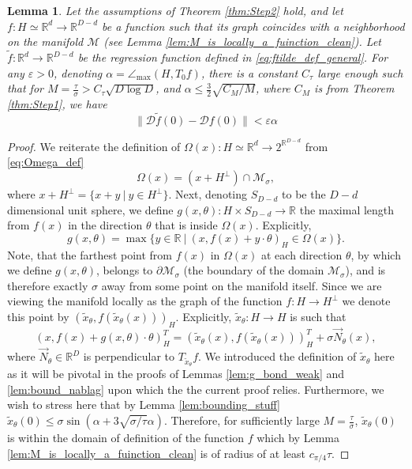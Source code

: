 \documentclass[12pt]{article}
\newtheorem{Lemma}[Theorem]{Lemma}
\theoremstyle{remark}
\newcommand{\RR}{\mathbb{R}}
\newcommand{\MM}{\mathcal{M}}
\newcommand{\DD}{\mathcal{D}}
\newcommand{\eps}{\varepsilon}
\newcommand{\wtilde}[1]{\widetilde{#1}}
\newcommand{\maxangle}{\angle_{\max}}
\begin{document}
\begin{appendices}
\begin{Lemma}\label{lem:bound_Df-Dfwtilde}
 Let the assumptions of Theorem \ref{thm:Step2} hold, and let $ f:H\simeq\RR^d\to\RR^{D-d} $ be a function such that its graph coincides with a neighborhood on the manifold $\MM$ (see Lemma \ref{lem:M_is_locally_a_fuinction_clean}). Let $\wtilde f:\RR^d\to\RR^{D-d} $ be the regression function   defined in \eqref{eq:ftilde_def_general}. 
 For any $\eps>0$, denoting $\alpha = \maxangle(H, T_0 f)$, there is a constant $C_\tau$ large enough such that for $M = \frac{\tau}{\sigma} >C_\tau\sqrt{D \log D}$, and $\alpha \leq \frac{3}{2} \sqrt{C_M/M}$, where $C_M$ is from Theorem \ref{thm:Step1}, we have 
    \[
    \|\DD\wtilde{f}(0) - \DD f(0)\| < \eps \alpha
    \]
\end{Lemma}
\begin{proof}
We reiterate the definition of $\Omega(x):H \simeq \RR^d \to 2^{\RR^{D-d}}$ from \eqref{eq:Omega_def}
\begin{equation*}
\Omega(x) = (x + H^\perp) \cap  \MM_\sigma
,    
\end{equation*}
where $x + H^\perp = \{x + y ~|~ y\in H^\perp\}$.
Next, denoting $S_{D-d}$ to be the $D-d$ dimensional unit sphere, we define $g(x, \theta):H\times S_{D-d}\to \RR$ the maximal length from $f(x)$ in the direction $\theta$ that is inside $\Omega(x)$.
Explicitly,
\begin{equation}\label{eq:g_def}
g(x, \theta) = \max\{y\in \RR ~|~ (x,f(x) + y\cdot \theta)_H  \in \Omega(x)\}
.    
\end{equation}
Note, that the farthest point from $f(x)$ in $\Omega(x)$ at each direction $\theta$, by which we define $g(x, \theta)$, belongs to $\partial\MM_\sigma$ (the boundary of the domain $\MM_\sigma$), and is therefore exactly $\sigma$ away from some point on the manifold itself.
Since we are viewing the manifold locally as the graph of the function $f:H\to H^\perp$ we denote this point by $(\wtilde x_\theta, f(\wtilde x_\theta(x)))_H$.
Explicitly, $\wtilde{x}_\theta:H \to H$ is such that
\begin{equation}\label{eq:x_tilde_def}
    (x ,f(x) + g(x, \theta) \cdot \theta)_H^T  = (\wtilde x_\theta(x), f(\wtilde x_\theta(x)))_H^T + \sigma \vec N_\theta (x)
,\end{equation}
where $\vec N_\theta \in \RR^D$ is perpendicular to $T_{\wtilde x_\theta}f$.
We introduced the definition of $\wtilde{x}_\theta$ here as it will be pivotal in the proofs of Lemmas \ref{lem:g_bond_weak} and \ref{lem:bound_nablag} upon which the the current proof relies.
Furthermore, we wish to stress here that by Lemma \ref{lem:bounding_stuff} $\wtilde x_\theta(0) \leq \sigma \sin (\alpha + 3 \sqrt{\sigma/\tau}\alpha)$.
Therefore, for sufficiently large $M = \frac{\tau}{\sigma}$, $\wtilde x_\theta(0)$ is within the domain of definition of the function $f$ which by Lemma \ref{lem:M_is_locally_a_fuinction_clean} is of radius of at least $c_{\pi/4}\tau$.


\end{proof}
\end{appendices}
\end{document}
